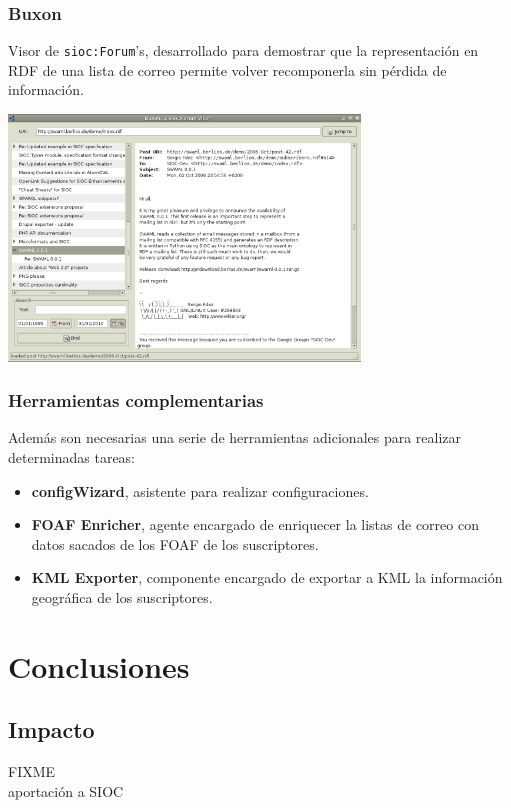 \documentclass[spanish,notes=hide]{beamer}
\begin{document}
\frame
{
  \frametitle{Buxon}

  Visor de \texttt{sioc:Forum}'s, desarrollado para demostrar que la representación en RDF de una lista de correo
  permite volver recomponerla sin pérdida de información.

  \begin{center}
	\includegraphics[width=0.7\textwidth]{images/buxon.png}
  \end{center}
}
\frame
{
  \frametitle{Herramientas complementarias}

  Además son necesarias una serie de herramientas adicionales para realizar determinadas tareas:

  \begin{itemize}
   \item \textbf{configWizard}, asistente para realizar configuraciones.
   \item \textbf{FOAF Enricher}, agente encargado de enriquecer la listas de correo con datos 
	 sacados de los FOAF de los suscriptores.
   \item \textbf{KML Exporter}, componente encargado de exportar a KML la información geográfica de los suscriptores.
  \end{itemize}
}

\section{Conclusiones}
\subsection{Impacto}
\frame
{
  FIXME\\
  aportación a SIOC
}
\end{document}
